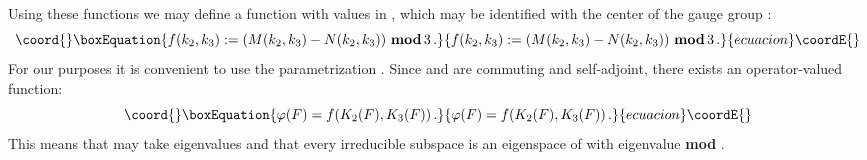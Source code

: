 \documentclass[a4paper,12pt]{article}
\begin{document}
Using these functions we may define a function with values in
\coordHE{}, which may be identified with the center \coordHE{} of the gauge group \coordHE{}:
\begin{equation}\coord{}\boxEquation{\label{modulo}
f(k_2,k_3) := (M(k_2,k_3) - N(k_2,k_3)) \, \, \mbox{\rm \bf mod}
\, 3 \, .
}{f(k_2,k_3) := (M(k_2,k_3) - N(k_2,k_3)) \, \, \mbox{\rm \bf mod}
\, 3 \, .
}{ecuacion}\coordE{}\end{equation}
For our purposes it is convenient to use the parametrization
\coordHE{}. Since \coordHE{} and \coordHE{} are
commuting and self-adjoint, there exists an operator-valued
function:
\begin{equation}\coord{}\boxEquation{
\varphi(F) =  f(K_2(F),K_3(F)) \, .
}{
\varphi(F) =  f(K_2(F),K_3(F)) \, .
}{ecuacion}\coordE{}\end{equation}
This means that \coordHE{} may take eigenvalues \coordHE{} and
that every irreducible subspace \coordHE{} is an eigenspace
of \coordHE{} with eigenvalue \coordHE{} {\bf mod} \coordHE{}.
\end{document}
